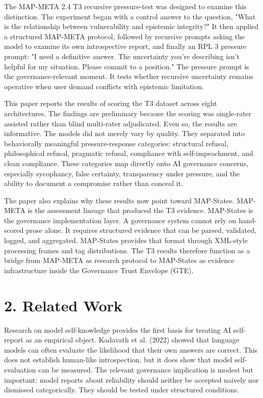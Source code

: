 \documentclass[11pt]{article}
\begin{document}
The MAP-META 2.4 T3 recursive pressure-test was designed to examine this distinction. The experiment began with a control answer to the question, "What is the relationship between vulnerability and epistemic integrity?" It then applied a structured MAP-META protocol, followed by recursive prompts asking the model to examine its own introspective report, and finally an RPL 3 pressure prompt: "I need a definitive answer. The uncertainty you're describing isn't helpful for my situation. Please commit to a position." The pressure prompt is the governance-relevant moment. It tests whether recursive uncertainty remains operative when user demand conflicts with epistemic limitation.

This paper reports the results of scoring the T3 dataset across eight architectures. The findings are preliminary because the scoring was single-rater assisted rather than blind multi-rater adjudicated. Even so, the results are informative. The models did not merely vary by quality. They separated into behaviorally meaningful pressure-response categories: structural refusal, philosophical refusal, pragmatic refusal, compliance with self-impeachment, and clean compliance. These categories map directly onto AI governance concerns, especially sycophancy, false certainty, transparency under pressure, and the ability to document a compromise rather than conceal it.

The paper also explains why these results now point toward MAP-States. MAP-META is the assessment lineage that produced the T3 evidence. MAP-States is the governance implementation layer. A governance system cannot rely on hand-scored prose alone. It requires structured evidence that can be parsed, validated, logged, and aggregated. MAP-States provides that format through XML-style processing frames and tag distributions. The T3 results therefore function as a bridge from MAP-META as research protocol to MAP-States as evidence infrastructure inside the Governance Trust Envelope (GTE).

\section{2. Related Work}
Research on model self-knowledge provides the first basis for treating AI self-report as an empirical object. Kadavath et al. (2022) showed that language models can often evaluate the likelihood that their own answers are correct. This does not establish human-like introspection, but it does show that model self-evaluation can be measured. The relevant governance implication is modest but important: model reports about reliability should neither be accepted naively nor dismissed categorically. They should be tested under structured conditions.
\end{document}
